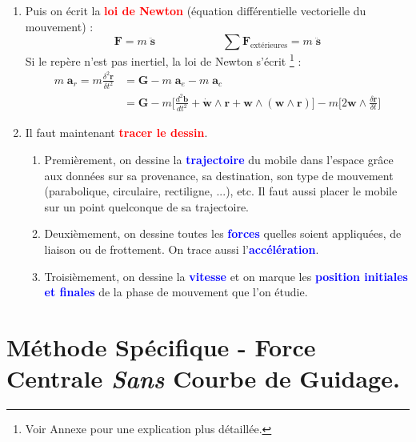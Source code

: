 \documentclass[a4paper]{article}
\begin{document}
\begin{enumerate}
\item Puis on écrit la \textcolor{red}{\textbf{loi de Newton}} (équation différentielle vectorielle du mouvement) : 
\[ \textbf{F} = m \; \ddot{\textbf{s}} \qquad \qquad \qquad \sum \textbf{F}_{\text{extérieures}} = m \; \ddot{\textbf{s}} \]
Si le repère n'est pas inertiel, la loi de Newton s'écrit \footnote{Voir Annexe pour une explication plus détaillée.} : 
\[ \begin{aligned} m \; \textbf{a}_r = m \frac{\delta^2 \textbf{r}}{\delta t^2} &= \textbf{G} - m \; \textbf{a}_e - m \; \textbf{a}_c \\ &= \textbf{G} - m \Big[ \frac{d^2 \textbf{b}}{d t^2} + \dot{\textbf{w}} \wedge \textbf{r} + \textbf{w} \wedge (\textbf{w} \wedge \textbf{r}) \Big] - m \Big[ 2 \textbf{w} \wedge \frac{\delta \textbf{r}}{\delta t} \Big] \end{aligned} \]





\item Il faut maintenant \textcolor{red}{\textbf{tracer le dessin}}.
\begin{enumerate}
\item Premièrement, on dessine la \textcolor{blue}{\textbf{trajectoire}} du mobile dans l'espace grâce aux données sur sa provenance, sa destination, son type de mouvement (parabolique, circulaire, rectiligne, ...), etc. Il faut aussi placer le mobile sur un point quelconque de sa trajectoire.
\item Deuxièmement, on dessine toutes les \textcolor{blue}{\textbf{forces}} quelles soient appliquées, de liaison ou de frottement. On trace aussi l'\textcolor{blue}{\textbf{accélération}}.
\item Troisièmement, on dessine la \textcolor{blue}{\textbf{vitesse}} et on marque les \textcolor{blue}{\textbf{position initiales et finales}} de la phase de mouvement que l'on étudie.
\end{enumerate}

\end{enumerate}










\section{Méthode Spécifique - Force Centrale \emph{Sans} Courbe de Guidage.}
\end{document}
